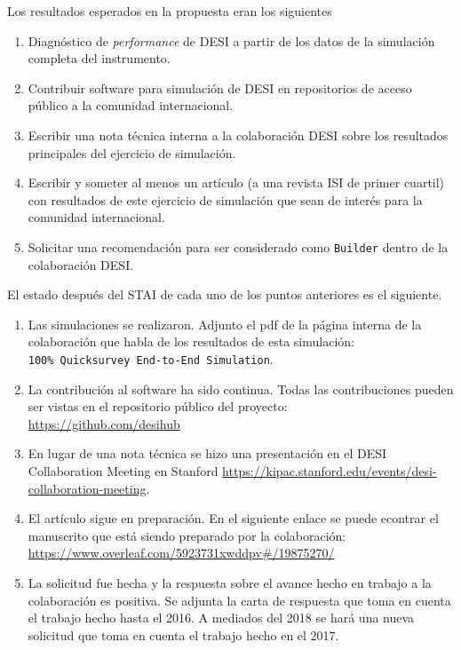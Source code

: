 \documentclass[12pt,spanish]{article}
\begin{document}
Los resultados esperados en la propuesta eran los siguientes
\begin{enumerate}
\item Diagn\'ostico de \textit{performance} de DESI a partir de los
  datos de la simulaci\'on completa del instrumento.  
\item Contribuir software para simulaci\'on de DESI en repositorios de
  acceso p\'ublico a la comunidad internacional.
\item Escribir una nota t\'ecnica interna a la colaboraci\'on DESI
  sobre los resultados principales del ejercicio de simulaci\'on.
\item Escribir y someter al menos un art\'iculo (a una revista ISI
  de primer cuartil) con resultados de este ejercicio de
  simulaci\'on que sean de inter\'es para la comunidad internacional.  
\item Solicitar una recomendaci\'on para ser   considerado como
  \texttt{Builder}  dentro de la colaboraci\'on DESI.  
 \end{enumerate}

El estado despu\'es del STAI de cada uno de los puntos anteriores es
el siguiente.

\begin{enumerate}
\item Las simulaciones se realizaron. Adjunto el pdf de la p\'agina
  interna de la colaboraci\'on que habla de los resultados de esta simulaci\'on:\\
  \verb"100% Quicksurvey End-to-End Simulation".
\item La contribuci\'on al software ha sido continua. Todas las
  contribuciones pueden ser vistas en el repositorio p\'ublico del
  proyecto:\\ \url{https://github.com/desihub}
\item En lugar de una nota t\'ecnica se hizo una presentaci\'on en el
  DESI Collaboration Meeting en Stanford
  \url{https://kipac.stanford.edu/events/desi-collaboration-meeting}. 
\item El art\'iculo sigue en preparaci\'on. En el siguiente enlace se
  puede econtrar el manuscrito que est\'a siendo preparado por la
  colaboraci\'on:\\ \url{https://www.overleaf.com/5923731xwddpv#/19875270/}
\item La solicitud fue hecha y la respuesta sobre el avance hecho en
  trabajo a la colaboraci\'on es positiva. Se adjunta la carta de
  respuesta que toma en cuenta el trabajo hecho hasta el 2016. 
A mediados del 2018 se har\'a una nueva solicitud que
  toma en cuenta el trabajo hecho en el 2017.
\end{enumerate}
\end{document}
